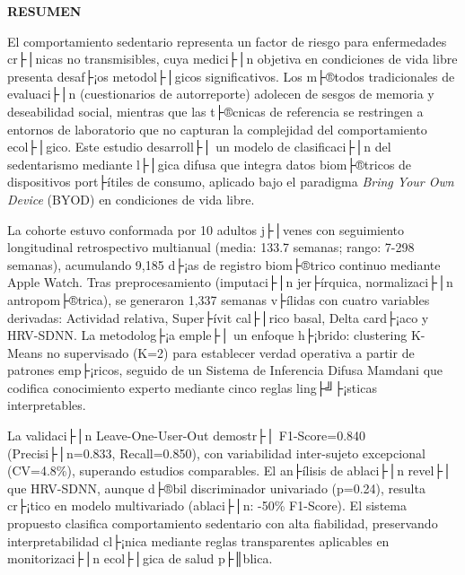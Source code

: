 \documentclass[12pt,letterpaper,oneside]{report}
\begin{document}
\newpage
{}  %
\setcounter{page}{1}
\thispagestyle{empty}

{\centering
{\fontsize{14}{16}\selectfont\bfseries RESUMEN}\\[1cm]
}

\setlength{\parindent}{1.27cm}
\onehalfspacing
\setlength{\parskip}{6pt plus 2pt minus 1pt}

\noindent El comportamiento sedentario representa un factor de riesgo para enfermedades cr├│nicas no transmisibles, cuya medici├│n objetiva en condiciones de vida libre presenta desaf├¡os metodol├│gicos significativos. Los m├®todos tradicionales de evaluaci├│n (cuestionarios de autorreporte) adolecen de sesgos de memoria y deseabilidad social, mientras que las t├®cnicas de referencia se restringen a entornos de laboratorio que no capturan la complejidad del comportamiento ecol├│gico. Este estudio desarroll├│ un modelo de clasificaci├│n del sedentarismo mediante l├│gica difusa que integra datos biom├®tricos de dispositivos port├ítiles de consumo, aplicado bajo el paradigma \textit{Bring Your Own Device} (BYOD) en condiciones de vida libre.

La cohorte estuvo conformada por 10 adultos j├│venes con seguimiento longitudinal retrospectivo multianual (media: 133.7 semanas; rango: 7-298 semanas), acumulando 9,185 d├¡as de registro biom├®trico continuo mediante Apple Watch. Tras preprocesamiento (imputaci├│n jer├írquica, normalizaci├│n antropom├®trica), se generaron 1,337 semanas v├ílidas con cuatro variables derivadas: Actividad relativa, Super├ívit cal├│rico basal, Delta card├¡aco y HRV-SDNN. La metodolog├¡a emple├│ un enfoque h├¡brido: clustering K-Means no supervisado (K=2) para establecer verdad operativa a partir de patrones emp├¡ricos, seguido de un Sistema de Inferencia Difusa Mamdani que codifica conocimiento experto mediante cinco reglas ling├╝├¡sticas interpretables.

La validaci├│n Leave-One-User-Out demostr├│ F1-Score=0.840 (Precisi├│n=0.833, Recall=0.850), con variabilidad inter-sujeto excepcional (CV=4.8\%), superando estudios comparables. El an├ílisis de ablaci├│n revel├│ que HRV-SDNN, aunque d├®bil discriminador univariado (p=0.24), resulta cr├¡tico en modelo multivariado (ablaci├│n: -50\% F1-Score). El sistema propuesto clasifica comportamiento sedentario con alta fiabilidad, preservando interpretabilidad cl├¡nica mediante reglas transparentes aplicables en monitorizaci├│n ecol├│gica de salud p├║blica.
\end{document}
